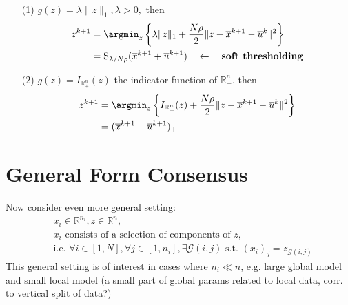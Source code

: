 \begin{eg}\ 
\begin{itemize}
\item[(1)] $g(z) = \lambda \lVert z \rVert_1, \lambda > 0,$ then
\begin{align*}
    z^{k+1} & = \argmin_z \left\{ \lambda \lVert z \rVert_1 + \dfrac{N\rho}{2} \lVert z - \overline{x}^{k+1} - \overline{u}^k \rVert^2 \right\} \\
    & = \operatorname{S}_{\lambda/N\rho} (\overline{x}^{k+1} + \overline{u}^{k+1}) \quad \leftarrow \quad \textbf{soft thresholding}
\end{align*}
\item[(2)] $g(z) = I_{\mathbb{R}^n_+}(z)$ the indicator function of $\mathbb{R}^n_+$, then
\begin{align*}
    z^{k+1} & = \argmin_z \left\{ I_{\mathbb{R}^n_+}(z) + \dfrac{N\rho}{2} \lVert z - \overline{x}^{k+1} - \overline{u}^k \rVert^2 \right\} \\
    & = (\overline{x}^{k+1} + \overline{u}^{k+1})_+
\end{align*}
\end{itemize}
\end{eg}


\section{General Form Consensus}

Now consider even more general setting:
\begin{align*}
    & x_i \in \mathbb{R}^{n_i}, z \in \mathbb{R}^n, \\
    & \text{$x_i$ consists of a selection of components of $z$,} \\
    & \text{i.e. } \forall i \in [1,N], \forall j \in [1,n_i], \exists \mathcal{G}(i,j) \text{ s.t. } (x_i)_j = z_{\mathcal{G}(i,j)}
\end{align*}
This general setting is of interest in cases where $n_i \ll n$, e.g. large global model and small local model (a small part of global params related to local data, corr. to vertical split of data?)


